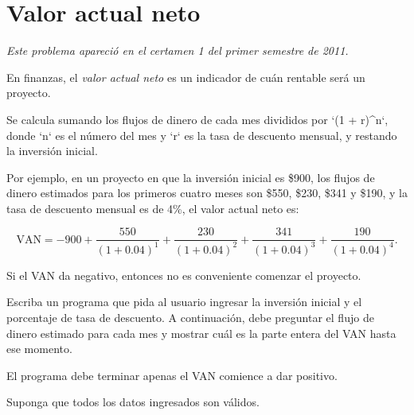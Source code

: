 \section{Valor actual neto}

\emph{Este problema apareció en el certamen 1 del primer semestre de
2011.}

En finanzas, el \emph{valor actual neto} es un indicador de cuán
rentable será un proyecto.

Se calcula sumando los flujos de dinero de cada mes divididos por `(1 +
r)\^{}n`, donde `n` es el número del mes y `r` es la tasa de descuento
mensual, y restando la inversión inicial.

Por ejemplo, en un proyecto en que la inversión inicial es \$900, los
flujos de dinero estimados para los primeros cuatro meses son \$550,
\$230, \$341 y \$190, y la tasa de descuento mensual es de 4\%, el valor
actual neto es:

\[\text{VAN} = -900 +
\frac{550}{(1 + 0.04)^1} +
\frac{230}{(1 + 0.04)^2} +
\frac{341}{(1 + 0.04)^3} +
\frac{190}{(1 + 0.04)^4}.\]

Si el VAN da negativo, entonces no es conveniente comenzar el proyecto.

Escriba un programa que pida al usuario ingresar la inversión inicial y
el porcentaje de tasa de descuento. A continuación, debe preguntar el
flujo de dinero estimado para cada mes y mostrar cuál es la parte entera
del VAN hasta ese momento.

El programa debe terminar apenas el VAN comience a dar positivo.

Suponga que todos los datos ingresados son válidos.
